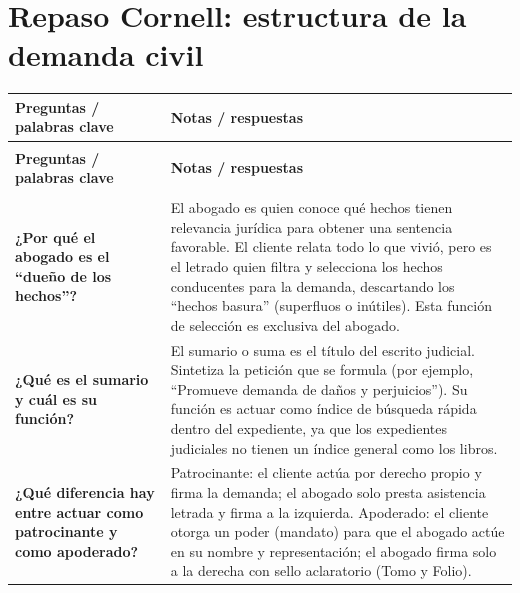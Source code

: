 \documentclass[12pt,oneside]{book}
\begin{document}
\chapter{Repaso Cornell: estructura de la demanda civil}

\begin{longtable}{
    >{\raggedright\arraybackslash}p{}
    >{\raggedright\arraybackslash}p{}
}
\toprule
\textbf{Preguntas / palabras clave} & \textbf{Notas / respuestas} \\
\midrule
\endfirsthead

\multicolumn{2}{l}{\small\itshape (continúa de la página anterior)} \\
\toprule
\textbf{Preguntas / palabras clave} & \textbf{Notas / respuestas} \\
\midrule
\endhead

\midrule
\multicolumn{2}{r}{\small\itshape continúa en la página siguiente} \\
\endfoot

\bottomrule
\endlastfoot


\textbf{¿Por qué el abogado es el ``dueño de los hechos''?} &
El abogado es quien conoce qué hechos tienen relevancia jurídica para obtener una sentencia favorable. El cliente relata todo lo que vivió, pero es el letrado quien filtra y selecciona los hechos conducentes para la demanda, descartando los ``hechos basura'' (superfluos o inútiles). Esta función de selección es exclusiva del abogado. \\

\textbf{¿Qué es el sumario y cuál es su función?} &
El sumario o suma es el título del escrito judicial. Sintetiza la petición que se formula (por ejemplo, ``Promueve demanda de daños y perjuicios''). Su función es actuar como índice de búsqueda rápida dentro del expediente, ya que los expedientes judiciales no tienen un índice general como los libros. \\

\textbf{¿Qué diferencia hay entre actuar como patrocinante y como apoderado?} &
Patrocinante: el cliente actúa por derecho propio y firma la demanda; el abogado solo presta asistencia letrada y firma a la izquierda. Apoderado: el cliente otorga un poder (mandato) para que el abogado actúe en su nombre y representación; el abogado firma solo a la derecha con sello aclaratorio (Tomo y Folio). \\


\end{longtable}
\end{document}
